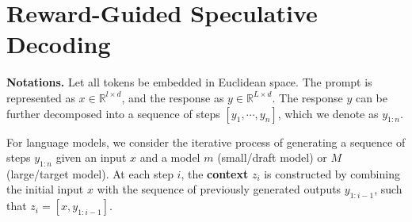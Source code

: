 \documentclass{article}
\theoremstyle{plain}
\theoremstyle{definition}
\theoremstyle{remark}
\newcommand{\JN}[1]{\textbf{\textcolor{blue}{[JN: #1]}}}
\begin{document}

\section{Reward-Guided Speculative Decoding} %



\textbf{Notations.} Let all tokens be embedded in Euclidean space. The prompt is represented as \( x \in \mathbb{R}^{l \times d} \), and the response as \( y \in \mathbb{R}^{L \times d} \). The response \( y \) can be further decomposed into a sequence of steps \( [y_1, \cdots, y_n] \), which we denote as \( y_{1:n} \).

For language models, we consider the iterative process of generating a sequence of steps \( y_{1:n} \) given an input \( x \) and a model \( m \) (small/draft model) or \( M \) (large/target model). At each step \( i \), the \textbf{context} \( z_i \) is constructed by combining the initial input \( x \) with the sequence of previously generated outputs \( y_{1:i-1} \), such that \( z_i = [x, y_{1:i-1}] \). 
\end{document}
